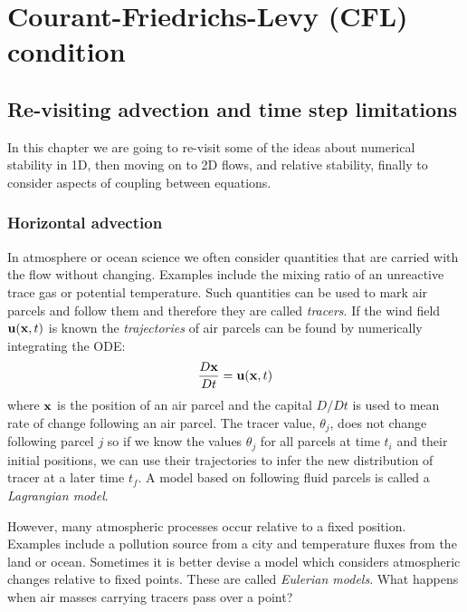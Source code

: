\chapter{Courant-Friedrichs-Levy (CFL) condition}

\section{Re-visiting advection and time step limitations}

In this chapter we are going to re-visit some of the ideas about numerical stability in 1D, then moving on to 2D flows, and relative stability, finally to consider aspects of coupling between equations.

\subsection{Horizontal advection}

In atmosphere or ocean science we often consider quantities that are
carried with the flow without changing. Examples include the mixing
ratio of an unreactive trace gas or potential temperature. Such
quantities can be used to mark air parcels and follow them and
therefore they are called {\em tracers}. If the wind field ${\bf
	u}({\bf x}, t)$ is known the {\em trajectories} of air parcels can be
found by numerically integrating the ODE:
\begin{equation}
	\frac{D{\bf x}}{Dt}={\bf u}({\bf x}, t)
\end{equation}
where ${\bf x}$ is the position of an air parcel and the capital
$D/Dt$ is used to mean rate of change following an air parcel. 
The tracer value, $\theta_j$, does not change following parcel $j$ so
if we know the values $\theta_j$ for all parcels at time $t_i$ and
their initial positions, we can use their trajectories
to infer the new distribution of tracer at a later time $t_f$. A model
based on following fluid parcels is called a {\em Lagrangian model}.

However, many atmospheric processes occur relative to a fixed
position. Examples include a pollution source from a city and
temperature fluxes from the land or ocean. Sometimes it is better
devise a model which considers atmospheric changes relative to fixed
points. These are called {\em Eulerian
	models}. What happens when air masses carrying tracers pass over a
point?

